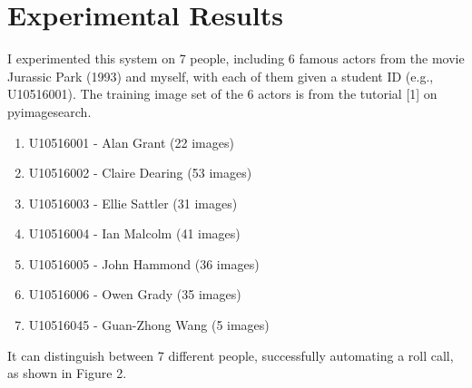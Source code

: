 \section{Experimental Results}
I experimented this system on 7 people, including 6 famous actors from the movie Jurassic Park (1993) and
myself, with each of them given a student ID (e.g., U10516001). The training image set of the 6 actors is
from the tutorial [1] on pyimagesearch.
\newline

\begin{enumerate}
  \item U10516001 - Alan Grant (22 images)
  \item U10516002 - Claire Dearing (53 images)
  \item U10516003 - Ellie Sattler (31 images)
  \item U10516004 - Ian Malcolm (41 images)
  \item U10516005 - John Hammond (36 images)
  \item U10516006 - Owen Grady (35 images)
  \item U10516045 - Guan-Zhong Wang (5 images)
\end{enumerate}

It can distinguish between 7 different people, successfully automating a roll call, as shown in Figure 2.


